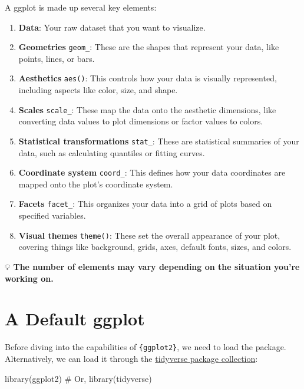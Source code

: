 \documentclass[
  letterpaper,
  DIV=11,
  numbers=noendperiod]{scrreprt}
\newenvironment{Shaded}{\begin{snugshade}}{\end{snugshade}}
\newcommand{\CommentTok}[1]{\textcolor[rgb]{0.37,0.37,0.37}{#1}}
\newcommand{\FunctionTok}[1]{\textcolor[rgb]{0.28,0.35,0.67}{#1}}
\newcommand{\NormalTok}[1]{\textcolor[rgb]{0.00,0.23,0.31}{#1}}
\providecommand{\tightlist}{%
  \setlength{\itemsep}{0pt}\setlength{\parskip}{0pt}}\usepackage{longtable,booktabs,array}
\begin{document}
A ggplot is made up several key elements:

\begin{enumerate}
\def\labelenumi{\arabic{enumi}.}
\tightlist
\item
  \textbf{Data}: Your raw dataset that you want to visualize.
\item
  \textbf{Geometries} \texttt{geom\_}: These are the shapes that
  represent your data, like points, lines, or bars.
\item
  \textbf{Aesthetics} \texttt{aes()}: This controls how your data is
  visually represented, including aspects like color, size, and shape.
\item
  \textbf{Scales} \texttt{scale\_}: These map the data onto the
  aesthetic dimensions, like converting data values to plot dimensions
  or factor values to colors.
\item
  \textbf{Statistical transformations} \texttt{stat\_}: These are
  statistical summaries of your data, such as calculating quantiles or
  fitting curves.
\item
  \textbf{Coordinate system} \texttt{coord\_}: This defines how your
  data coordinates are mapped onto the plot's coordinate system.
\item
  \textbf{Facets} \texttt{facet\_}: This organizes your data into a grid
  of plots based on specified variables.
\item
  \textbf{Visual themes} \texttt{theme()}: These set the overall
  appearance of your plot, covering things like background, grids, axes,
  default fonts, sizes, and colors.
\end{enumerate}

💡 \textbf{The number of elements may vary depending on the situation
you're working on.}

\section{A Default ggplot}\label{default}

Before diving into the capabilities of \texttt{\{ggplot2\}}, we need to
load the package. Alternatively, we can load it through the
\href{https://www.tidyverse.org/}{tidyverse package collection}:

\begin{Shaded}
\begin{Highlighting}[]
\FunctionTok{library}\NormalTok{(ggplot2)}
\CommentTok{\# Or,}
\FunctionTok{library}\NormalTok{(tidyverse)}
\end{Highlighting}
\end{Shaded}
\end{document}
